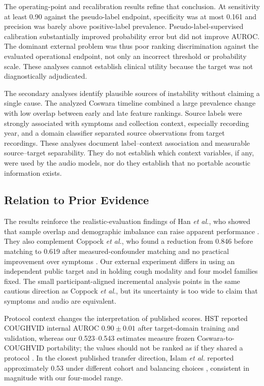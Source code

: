\documentclass[journal]{IEEEtran}
\begin{document}
The operating-point and recalibration results refine that conclusion. At sensitivity at least 0.90 against the pseudo-label endpoint, specificity was at most 0.161 and precision was barely above positive-label prevalence. Pseudo-label-supervised calibration substantially improved probability error but did not improve AUROC. The dominant external problem was thus poor ranking discrimination against the evaluated operational endpoint, not only an incorrect threshold or probability scale. These analyses cannot establish clinical utility because the target was not diagnostically adjudicated.

The secondary analyses identify plausible sources of instability without claiming a single cause. The analyzed Coswara timeline combined a large prevalence change with low overlap between early and late feature rankings. Source labels were strongly associated with symptoms and collection context, especially recording year, and a domain classifier separated source observations from target recordings. These analyses document label--context association and measurable source--target separability. They do not establish which context variables, if any, were used by the audio models, nor do they establish that no portable acoustic information exists.

\subsection{Relation to Prior Evidence}

The results reinforce the realistic-evaluation findings of Han \emph{et al.}, who showed that sample overlap and demographic imbalance can raise apparent performance \cite{han2022sounds}. They also complement Coppock \emph{et al.}, who found a reduction from 0.846 before matching to 0.619 after measured-confounder matching and no practical improvement over symptoms \cite{coppock2024symptoms}. Our external experiment differs in using an independent public target and in holding cough modality and four model families fixed. The small participant-aligned incremental analysis points in the same cautious direction as Coppock \emph{et al.}, but its uncertainty is too wide to claim that symptoms and audio are equivalent.

Protocol context changes the interpretation of published scores. HST reported COUGHVID internal AUROC $0.90\pm0.01$ after target-domain training and validation, whereas our 0.523--0.543 estimates measure frozen Coswara-to-COUGHVID portability; the values should not be ranked as if they shared a protocol \cite{aytekin2024hst}. In the closest published transfer direction, Islam \emph{et al.} reported approximately 0.53 under different cohort and balancing choices \cite{islam2026dndf}, consistent in magnitude with our four-model range.
\end{document}
